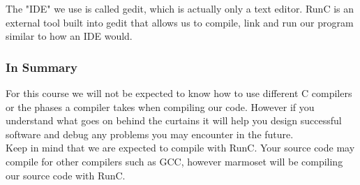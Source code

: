 The "IDE" we use is called gedit, which is actually only a text editor. RunC is an external tool built into gedit that allows us to compile, link and run our program similar to how an IDE would.\\

\subsubsection*{In Summary}

For this course we will not be expected to know how to use different C compilers or the phases a compiler takes when compiling our code. However if you understand what goes on behind the curtains it will help you design successful software and debug any problems you may encounter in the future.\\

Keep in mind that we are expected to compile with RunC. Your source code may compile for other compilers such as GCC, however marmoset will be compiling our source code with RunC.